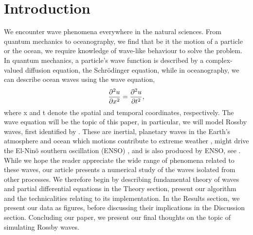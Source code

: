 \section{Introduction}
\label{sec:introduction}

We encounter wave phenomena everywhere in the natural sciences. From quantum mechanics to oceanography, we find that be it the motion of a particle or the ocean, we require knowledge of wave-like behaviour to solve the problem. In quantum mechanics, a particle's wave function is described by a complex-valued diffusion equation, the Schrödinger equation, while in oceanography, we can describe ocean waves using the wave equation,
	\begin{equation}
	\label{eq:wave}
	\pdv[2]{u}{x} = \pdv[2]{u}{t},
	\end{equation}
where x and t denote the spatial and temporal coordinates, respectively. The wave equation will be the topic of this paper, in particular, we will model Rossby waves, first identified by \citet{rossby}. These are inertial, planetary waves in the Earth's atmosphere and ocean which motions contribute to extreme weather \citep{mann2017influence}, might drive the El-Ninõ southern oscillation (ENSO) \citep{bosc2008observed}, and is also produced by ENSO, see \citet{battisti1989role}. While we hope the reader appreciate the wide range of phenomena related to these waves, our article presents a numerical study of the waves isolated from other processes. We therefore begin by describing fundamental theory of waves and partial differential equations in the Theory section, present our algorithm and the technicalities relating to its implementation. In the Results section, we present our data as figures, before discussing their implications in the Discussion section. Concluding our paper, we present our final thoughts on the topic of simulating Rossby waves.